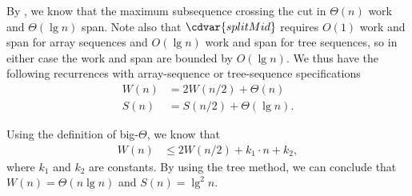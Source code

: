 \begin{gram}
%
%
By , we know that the maximum
subsequence crossing the cut in $\Theta(n)$ work and $\Theta(\lg{n})$
span.
%
Note also that $\cdvar{splitMid}$ requires $O(1)$ work and span for array sequences 
and $O(\lg n)$ work and span for tree sequences, so in either case the work and span
are bounded by $O(\lg n)$.
%
We thus have the following recurrences with array-sequence or
tree-sequence specifications
%
\begin{align*}
  W(n) &= 2W(n/2) + \Theta(n)\\
  S(n) &= S(n/2) +  \Theta(\lg n).
\end{align*}

Using the definition of big-$\Theta$, we know
that
\begin{align*}
  W(n) &\leq 2W(n/2) + k_1\cdot n + k_2,
\end{align*}
where $k_1$ and $k_2$ are constants.
%
By using the tree method, we can conclude that $W(n) = \Theta(n\lg{n})$ and
$S(n) = \lg^2{n}$.
%



\end{gram}

